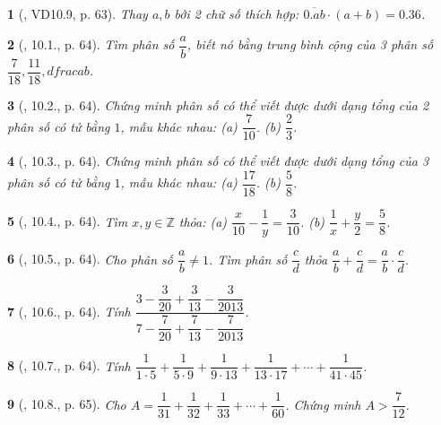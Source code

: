 \documentclass{article}
\newtheorem{baitoan}{}
\begin{document}
\begin{baitoan}[\cite{TLCT_THCS_Toan_6_so_hoc}, VD10.9, p. 63]
	Thay $a,b$ bởi 2 chữ số thích hợp: $\overline{0.ab}\cdot(a + b) = 0.36$.
\end{baitoan}

\begin{baitoan}[\cite{TLCT_THCS_Toan_6_so_hoc}, 10.1., p. 64]
	Tìm phân số $\dfrac{a}{b}$, biết nó bằng trung bình cộng của 3 phân số $\dfrac{7}{18},\dfrac{11}{18},dfrac{a}{b}$.
\end{baitoan}

\begin{baitoan}[\cite{TLCT_THCS_Toan_6_so_hoc}, 10.2., p. 64]
	Chứng minh phân số có thể viết được dưới dạng tổng của 2 phân số có tử bằng $1$, mẫu khác nhau: (a) $\dfrac{7}{10}$. (b) $\dfrac{2}{3}$.
\end{baitoan}

\begin{baitoan}[\cite{TLCT_THCS_Toan_6_so_hoc}, 10.3., p. 64]
	Chứng minh phân số có thể viết được dưới dạng tổng của 3 phân số có tử bằng $1$, mẫu khác nhau: (a) $\dfrac{17}{18}$. (b) $\dfrac{5}{8}$.
\end{baitoan}

\begin{baitoan}[\cite{TLCT_THCS_Toan_6_so_hoc}, 10.4., p. 64]
	Tìm $x,y\in\mathbb{Z}$ thỏa: (a) $\dfrac{x}{10} - \dfrac{1}{y} = \dfrac{3}{10}$. (b) $\dfrac{1}{x} + \dfrac{y}{2} = \dfrac{5}{8}$. 
\end{baitoan}

\begin{baitoan}[\cite{TLCT_THCS_Toan_6_so_hoc}, 10.5., p. 64]
	Cho phân số $\dfrac{a}{b}\ne1$. Tìm phân số $\dfrac{c}{d}$ thỏa $\dfrac{a}{b} + \dfrac{c}{d} = \dfrac{a}{b}\cdot\dfrac{c}{d}$.
\end{baitoan}

\begin{baitoan}[\cite{TLCT_THCS_Toan_6_so_hoc}, 10.6., p. 64]
	Tính $\dfrac{3 - \dfrac{3}{20} + \dfrac{3}{13} - \dfrac{3}{2013}}{7 - \dfrac{7}{20} + \dfrac{7}{13} - \dfrac{7}{2013}}$.
\end{baitoan}

\begin{baitoan}[\cite{TLCT_THCS_Toan_6_so_hoc}, 10.7., p. 64]
	Tính $\dfrac{1}{1\cdot5} + \dfrac{1}{5\cdot9} + \dfrac{1}{9\cdot13} + \dfrac{1}{13\cdot17} + \cdots + \dfrac{1}{41\cdot45}$.
\end{baitoan}

\begin{baitoan}[\cite{TLCT_THCS_Toan_6_so_hoc}, 10.8., p. 65]
	Cho $A = \dfrac{1}{31} + \dfrac{1}{32} + \dfrac{1}{33} + \cdots + \dfrac{1}{60}$. Chứng minh $A > \dfrac{7}{12}$.
\end{baitoan}
\end{document}
